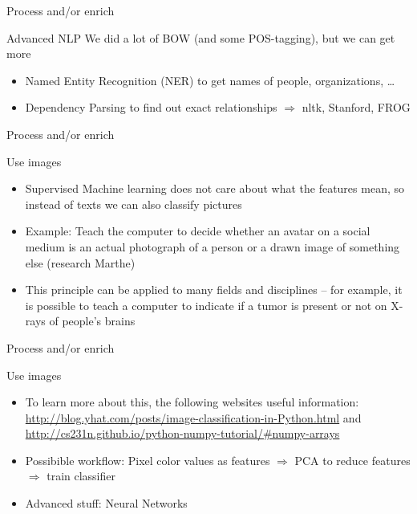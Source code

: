 \documentclass{beamer}
\begin{document}
\begin{frame}{Process and/or enrich}
	\begin{block}{Advanced NLP}
		We did a lot of BOW (and some POS-tagging), but we can get more
		\begin{itemize}
			\item Named Entity Recognition (NER) to get names of people, organizations, \ldots
			\item Dependency Parsing to find out exact relationships
			$\Rightarrow$ nltk, Stanford, FROG
		\end{itemize}
	\end{block}
\end{frame}



\begin{frame}{Process and/or enrich}
\begin{block}{Use images}
\begin{itemize}
	\item  Supervised Machine learning does not care about what the features mean, so instead of texts we can also classify pictures
	\item  Example: Teach the computer to decide whether an avatar on a social medium is an actual photograph of a person or a drawn image of something else (research Marthe)
	\item  This principle can be applied to many fields and disciplines -- for example, it is possible to teach a computer to indicate if a tumor is present or not on X-rays of people's brains
\end{itemize}
\end{block}
\end{frame}


\begin{frame}{Process and/or enrich}
	\begin{block}{Use images}
		\begin{itemize}
	\item To learn more about this, the following websites useful information: \url{http://blog.yhat.com/posts/image-classification-in-Python.html} and \url {http://cs231n.github.io/python-numpy-tutorial/\#numpy-arrays}
	\item Possibible workflow: Pixel color values as features $\Rightarrow$ PCA to reduce features  $\Rightarrow$ train classifier
	\item Advanced stuff: Neural Networks
\end{itemize}
	\end{block}
\end{frame}
\end{document}
